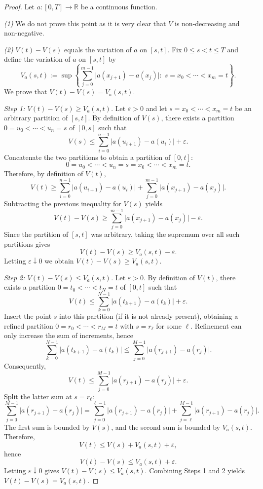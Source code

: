 \documentclass[10pt]{report}
\newcommand{\R}{\mathbb{R}}
\begin{document}
\begin{proof}
	Let $a:[0,T]\to\R$ be a continuous function.

	\emph{(1)} We do not prove this point as it is very clear that $V$ is non-decreasing and non-negative.

	\medskip

	\emph{(2)} $V(t)-V(s)$ equals the variation of $a$ on $[s,t]$.
	Fix $0\le s < t\le T$ and define the variation of $a$ on $[s,t]$ by
	\[
		V_a(s,t)
		:=
		\sup\left\{
		\sum_{j=0}^{m-1}\bigl|a(x_{j+1})-a(x_j)\bigr|
		:\;
		s=x_0<\cdots<x_m=t
		\right\}.
	\]
	We prove that $V(t)-V(s)=V_a(s,t)$.

	\medskip

	\emph{Step 1: $V(t)-V(s)\ge V_a(s,t)$.}
	Let $\varepsilon>0$ and let $s=x_0<\cdots<x_m=t$ be an arbitrary partition of $[s,t]$.
	By definition of $V(s)$, there exists a partition $0=u_0<\cdots<u_n=s$ of $[0,s]$
	such that
	\[
		V(s)\le \sum_{i=0}^{n-1}\bigl|a(u_{i+1})-a(u_i)\bigr|+\varepsilon.
	\]
	Concatenate the two partitions to obtain a partition of $[0,t]$:
	\[
		0=u_0<\cdots<u_n=s=x_0<\cdots<x_m=t.
	\]
	Therefore, by definition of $V(t)$,
	\[
		V(t)\ge
		\sum_{i=0}^{n-1}\bigl|a(u_{i+1})-a(u_i)\bigr|
		+
		\sum_{j=0}^{m-1}\bigl|a(x_{j+1})-a(x_j)\bigr|.
	\]
	Subtracting the previous inequality for $V(s)$ yields
	\[
		V(t)-V(s)\ge
		\sum_{j=0}^{m-1}\bigl|a(x_{j+1})-a(x_j)\bigr|-\varepsilon.
	\]
	Since the partition of $[s,t]$ was arbitrary, taking the supremum over all such
	partitions gives
	\[
		V(t)-V(s)\ge V_a(s,t)-\varepsilon.
	\]
	Letting $\varepsilon\downarrow0$ we obtain $V(t)-V(s)\ge V_a(s,t)$.

	\medskip

	\emph{Step 2: $V(t)-V(s)\le V_a(s,t)$.}
	Let $\varepsilon>0$. By definition of $V(t)$, there exists a partition
	$0=t_0<\cdots<t_N=t$ of $[0,t]$ such that
	\[
		V(t)\le \sum_{k=0}^{N-1}\bigl|a(t_{k+1})-a(t_k)\bigr|+\varepsilon.
	\]
	Insert the point $s$ into this partition (if it is not already present), obtaining
	a refined partition $0=r_0<\cdots<r_M=t$ with $s=r_\ell$ for some $\ell$.
	Refinement can only increase the sum of increments, hence
	\[
		\sum_{k=0}^{N-1}\bigl|a(t_{k+1})-a(t_k)\bigr|
		\le
		\sum_{j=0}^{M-1}\bigl|a(r_{j+1})-a(r_j)\bigr|.
	\]
	Consequently,
	\[
		V(t)\le \sum_{j=0}^{M-1}\bigl|a(r_{j+1})-a(r_j)\bigr|+\varepsilon.
	\]
	Split the latter sum at $s=r_\ell$:
	\[
		\sum_{j=0}^{M-1}\bigl|a(r_{j+1})-a(r_j)\bigr|
		=
		\sum_{j=0}^{\ell-1}\bigl|a(r_{j+1})-a(r_j)\bigr|
		+
		\sum_{j=\ell}^{M-1}\bigl|a(r_{j+1})-a(r_j)\bigr|.
	\]
	The first sum is bounded by $V(s)$, and the second sum is bounded by $V_a(s,t)$.
	Therefore,
	\[
		V(t)\le V(s)+V_a(s,t)+\varepsilon,
	\]
	hence
	\[
		V(t)-V(s)\le V_a(s,t)+\varepsilon.
	\]
	Letting $\varepsilon\downarrow0$ gives $V(t)-V(s)\le V_a(s,t)$.
	Combining Steps 1 and 2 yields $V(t)-V(s)=V_a(s,t)$.


\end{proof}
\end{document}

